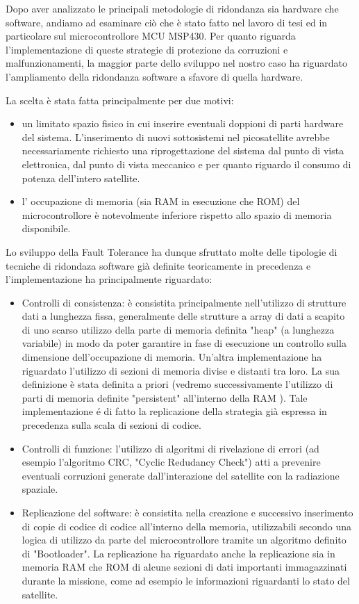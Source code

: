 \documentclass[LaM,binding=0.6cm]{../sapthesis}
\begin{document}
Dopo aver analizzato le principali metodologie di ridondanza sia hardware che software, andiamo ad esaminare ciò che è stato fatto nel lavoro di tesi ed in particolare sul microcontrollore MCU MSP430.
\newline
Per quanto riguarda l'implementazione di queste strategie di protezione da corruzioni e malfunzionamenti, la maggior parte dello sviluppo nel nostro caso  ha riguardato l'ampliamento della ridondanza software a sfavore di quella hardware.

La scelta è stata fatta principalmente per due motivi:
\begin{itemize}
    \item un limitato spazio fisico in cui inserire eventuali doppioni di parti hardware del sistema. L'inserimento di nuovi sottosistemi nel picosatellite avrebbe necessariamente richiesto una riprogettazione del sistema dal punto di vista elettronica, dal punto di vista meccanico e per quanto riguardo il consumo di potenza dell'intero satellite.
    \item l' occupazione di memoria (sia RAM in esecuzione che ROM) del microcontrollore è notevolmente inferiore rispetto allo spazio di memoria disponibile.
\end{itemize}
\newline
Lo sviluppo della Fault Tolerance ha dunque sfruttato molte delle tipologie di tecniche di ridondaza software già definite teoricamente in precedenza e 
l'implementazione ha principalmente riguardato:
\begin{itemize}
    \item Controlli di consistenza: è consistita principalmente nell'utilizzo di strutture dati a lunghezza fissa, generalmente delle strutture a array di dati a scapito di uno scarso utilizzo della parte di memoria definita "heap" (a lunghezza variabile) in modo da poter garantire in fase di esecuzione un controllo sulla dimensione dell'occupazione di memoria. Un'altra implementazione ha riguardato l'utilizzo di sezioni di memoria divise e distanti tra loro. La sua definizione è stata definita a priori (vedremo successivamente l'utilizzo di parti di memoria definite "persistent" all'interno della RAM ). Tale implementazione é di fatto la replicazione della strategia già espressa in precedenza sulla scala di sezioni di codice.
    \item Controlli di funzione: l'utilizzo di algoritmi di rivelazione di errori (ad esempio l'algoritmo CRC, "Cyclic Redudancy Check") atti a prevenire eventuali corruzioni generate dall'interazione del satellite con la radiazione spaziale.
    \item Replicazione del software: è consistita nella creazione e successivo inserimento di copie di codice di codice all'interno della memoria, utilizzabili secondo una logica di utilizzo da parte del microcontrollore tramite un algoritmo definito di "Bootloader". La replicazione ha riguardato anche la replicazione sia in memoria RAM che ROM di alcune sezioni di dati importanti immagazzinati durante la missione, come ad esempio le informazioni riguardanti lo stato del satellite.
\end{itemize}
\end{document}
